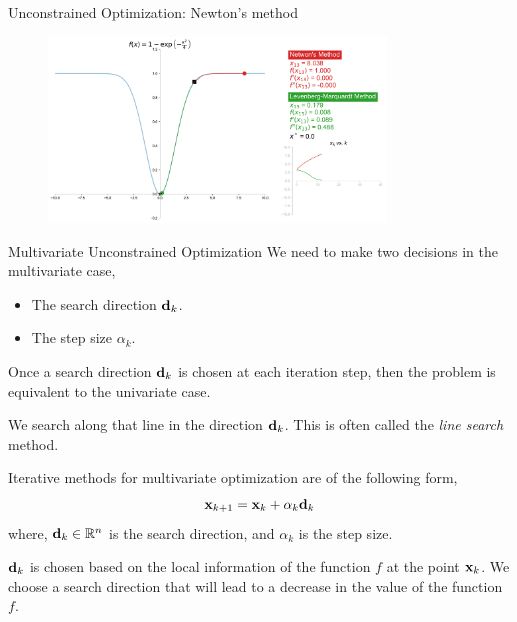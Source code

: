 \documentclass[aspectratio=169]{beamer}
\let\olditem\item
\renewcommand{\item}{\setlength{\itemsep}{\fill}\olditem}
\def\mf{\ensuremath\mathbf}
\def\mb{\ensuremath\mathbb}
\begin{document}
\begin{frame}{Unconstrained Optimization: Newton's method}
  \begin{figure}
    \centering
    \includegraphics[width=0.8\textwidth]{figs/newton_lm_compare.pdf}
  \end{figure}
\end{frame}


\begin{frame}{Multivariate Unconstrained Optimization}
  We need to make two decisions in the multivariate case,
  \begin{itemize}
    \item The search direction $\mf{d}_k$.
    \item The step size $\alpha_k$.
  \end{itemize}
  \vspace{0.2cm}
  
  Once a search direction $\mf{d}_k$ is chosen at each iteration step, then the problem is equivalent to the univariate case. 
  \vspace{0.2cm}

  We search along that line in the direction $\mf{d}_k$. This is often called the \textit{line search} method.
  \vspace{0.2cm}

  Iterative methods for multivariate optimization are of the following form,
  \[ \mf{x}_{k+1} = \mf{x}_{k} + \alpha_k \mf{d}_{k} \]
  where, $\mf{d}_k \in \mb{R}^n$ is the search direction, and $\alpha_k$ is the step size.
  \vspace{0.2cm}

  $\mf{d}_k$ is chosen based on the local information of the function $f$ at the point $\mf{x}_k$. We choose a search direction that will lead to a decrease in the value of the function $f$.
\end{frame}
\end{document}
